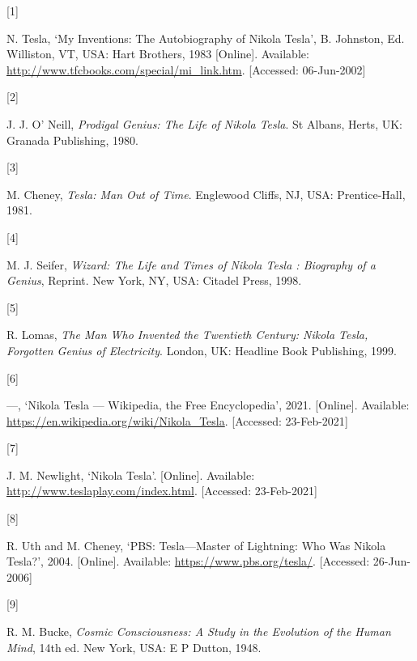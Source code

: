 \documentclass[
  a4paper,
]{article}
\newlength{\cslhangindent}
\newlength{\csllabelwidth}
\newlength{\cslentryspacingunit} %
\newenvironment{CSLReferences}[2] %
 {%
  \setlength{\parindent}{0pt}
  \ifodd #1
  \let\oldpar\par
  \def\par{\hangindent=\cslhangindent\oldpar}
  \fi
  \setlength{\parskip}{#2\cslentryspacingunit}
 }%
 {}
\newcommand{\CSLLeftMargin}[1]{\parbox[t]{\csllabelwidth}{#1}}
\newcommand{\CSLRightInline}[1]{\parbox[t]{\linewidth - \csllabelwidth}{#1}\break}
\begin{document}
\hypertarget{refs}{}
\begin{CSLReferences}{0}{0}
\leavevmode{}%
\CSLLeftMargin{{[}1{]} }
\CSLRightInline{N. Tesla, {`{My Inventions: The Autobiography of Nikola
Tesla}'}, B. Johnston, Ed. Williston, VT, USA: Hart Brothers, 1983
{[}Online{]}. Available:
\url{http://www.tfcbooks.com/special/mi_link.htm}. {[}Accessed:
06-Jun-2002{]}}

\leavevmode{}%
\CSLLeftMargin{{[}2{]} }
\CSLRightInline{J. J. O' Neill, \emph{{Prodigal Genius: The Life of
Nikola Tesla}}. St Albans, Herts, UK: Granada Publishing, 1980. }

\leavevmode{}%
\CSLLeftMargin{{[}3{]} }
\CSLRightInline{M. Cheney, \emph{{Tesla: Man Out of Time}}. Englewood
Cliffs, NJ, USA: Prentice-Hall, 1981. }

\leavevmode{}%
\CSLLeftMargin{{[}4{]} }
\CSLRightInline{M. J. Seifer, \emph{{Wizard: The Life and Times of
Nikola Tesla : Biography of a Genius}}, Reprint. New York, NY, USA:
Citadel Press, 1998. }

\leavevmode{}%
\CSLLeftMargin{{[}5{]} }
\CSLRightInline{R. Lomas, \emph{{The Man Who Invented the Twentieth
Century: Nikola Tesla, Forgotten Genius of Electricity}}. London, UK:
Headline Book Publishing, 1999. }

\leavevmode{}%
\CSLLeftMargin{{[}6{]} }
\CSLRightInline{---, {`{N}ikola {T}esla --- {Wikipedia}{,} the {F}ree
{E}ncyclopedia'}, 2021. {[}Online{]}. Available:
\url{https://en.wikipedia.org/wiki/Nikola_Tesla}. {[}Accessed:
23-Feb-2021{]}}

\leavevmode{}%
\CSLLeftMargin{{[}7{]} }
\CSLRightInline{J. M. Newlight, {`{Nikola Tesla}'}. {[}Online{]}.
Available: \url{http://www.teslaplay.com/index.html}. {[}Accessed:
23-Feb-2021{]}}

\leavevmode{}%
\CSLLeftMargin{{[}8{]} }
\CSLRightInline{R. Uth and M. Cheney, {`{PBS: Tesla---Master of
Lightning: Who Was Nikola Tesla?}'}, 2004. {[}Online{]}. Available:
\url{https://www.pbs.org/tesla/}. {[}Accessed: 26-Jun-2006{]}}

\leavevmode{}%
\CSLLeftMargin{{[}9{]} }
\CSLRightInline{R. M. Bucke, \emph{{Cosmic Consciousness: A Study in the
Evolution of the Human Mind}}, 14th ed. New York, USA: E P Dutton, 1948.
}


\end{CSLReferences}
\end{document}
